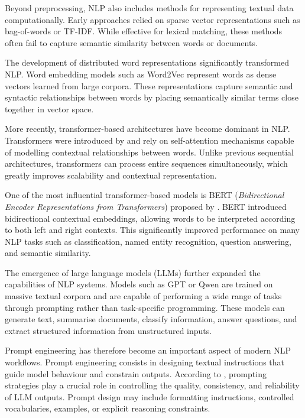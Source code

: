 \documentclass[
11pt,
english,
singlespacing,
headsepline,
]{MastersDoctoralThesis}
\begin{document}
Beyond preprocessing, NLP also includes methods for representing textual data computationally. Early approaches relied on sparse vector representations such as bag-of-words or TF-IDF. While effective for lexical matching, these methods often fail to capture semantic similarity between words or documents.

The development of distributed word representations significantly transformed NLP. Word embedding models such as Word2Vec \citep{mikolov2013efficient} represent words as dense vectors learned from large corpora. These representations capture semantic and syntactic relationships between words by placing semantically similar terms close together in vector space.

More recently, transformer-based architectures have become dominant in NLP. Transformers were introduced by \citet{vaswani2017attention} and rely on self-attention mechanisms capable of modelling contextual relationships between words. Unlike previous sequential architectures, transformers can process entire sequences simultaneously, which greatly improves scalability and contextual representation.

One of the most influential transformer-based models is BERT (\textit{Bidirectional Encoder Representations from Transformers}) proposed by \citet{devlin2019bert}. BERT introduced bidirectional contextual embeddings, allowing words to be interpreted according to both left and right contexts. This significantly improved performance on many NLP tasks such as classification, named entity recognition, question answering, and semantic similarity.

The emergence of large language models (LLMs) further expanded the capabilities of NLP systems. Models such as GPT \citep{brown2020language} or Qwen are trained on massive textual corpora and are capable of performing a wide range of tasks through prompting rather than task-specific programming. These models can generate text, summarise documents, classify information, answer questions, and extract structured information from unstructured inputs.

Prompt engineering has therefore become an important aspect of modern NLP workflows. Prompt engineering consists in designing textual instructions that guide model behaviour and constrain outputs. According to \citet{liu2023pre}, prompting strategies play a crucial role in controlling the quality, consistency, and reliability of LLM outputs. Prompt design may include formatting instructions, controlled vocabularies, examples, or explicit reasoning constraints.
\end{document}
